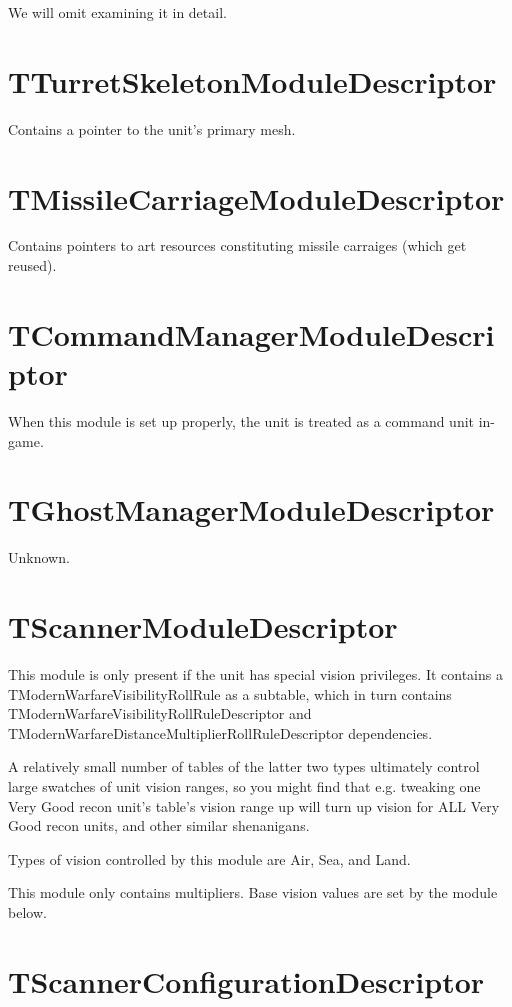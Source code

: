 \documentclass{article}
\begin{document}
We will omit examining it in detail.

\section{TTurretSkeletonModuleDescriptor}

Contains a pointer to the unit's primary mesh.

\section{TMissileCarriageModuleDescriptor}

Contains pointers to art resources constituting missile carraiges (which get reused).

\section{TCommandManagerModuleDescriptor}

When this module is set up properly, the unit is treated as a command unit in-game.

\section{TGhostManagerModuleDescriptor}

Unknown.

\section{TScannerModuleDescriptor}

This module is only present if the unit has special vision privileges. It contains a TModernWarfareVisibilityRollRule as a subtable, which in turn contains TModernWarfareVisibilityRollRuleDescriptor and TModernWarfareDistanceMultiplierRollRuleDescriptor dependencies.

A relatively small number of tables of the latter two types ultimately control large swatches of unit vision ranges, so you might find that e.g. tweaking one Very Good recon unit's table's vision range up will turn up vision for ALL Very Good recon units, and other similar shenanigans.

Types of vision controlled by this module are Air, Sea, and Land.

This module only contains multipliers. Base vision values are set by the module below.

\section{TScannerConfigurationDescriptor}
\end{document}
